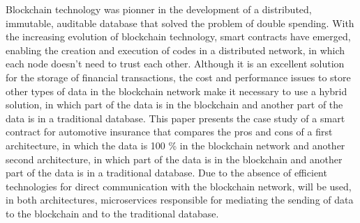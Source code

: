 Blockchain technology was pionner in the development of a distributed, immutable, auditable database that solved the problem of double spending. With the increasing evolution of blockchain technology, smart contracts have emerged, enabling the creation and execution of codes in a distributed network, in which each node doesn't need to trust each other. Although it is an excellent solution for the storage of financial transactions, the cost and performance issues to store other types of data in the blockchain network make it necessary to use a hybrid solution, in which part of the data is in the blockchain and another part of the data is in a traditional database. This paper presents the case study of a smart contract for automotive insurance that compares the pros and cons of a first architecture, in which the data is 100 \% in the blockchain network and another second architecture, in which part of the data is in the blockchain and another part of the data is in a traditional database. Due to the absence of efficient technologies for direct communication with the blockchain network, will be used, in both architectures, microservices responsible for mediating the sending of data to the blockchain and to the traditional database.